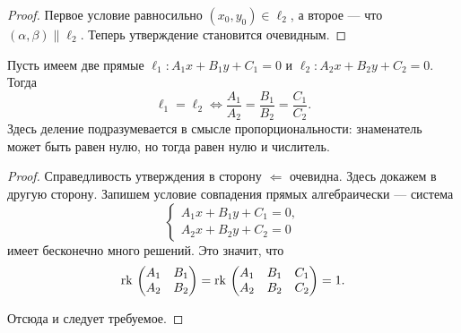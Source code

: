 \begin{proof}
    Первое условие равносильно $(x_0, y_0) \in \ell_2$, а второе --- что $(\alpha, \beta) \parallel \ell_2$. Теперь утверждение становится очевидным.
\end{proof}

\begin{statement}
    Пусть имеем две прямые $\ell_1: A_1x + B_1y + C_1 = 0$ и $\ell_2: A_2x + B_2y + C_2 = 0$. Тогда
    $$
    \ell_1 = \ell_2 \Leftrightarrow \frac{A_1}{A_2} = \frac{B_1}{B_2} = \frac{C_1}{C_2}.
    $$
    Здесь деление подразумевается в смысле пропорциональности: знаменатель может быть равен нулю, но тогда равен нулю и числитель.
\end{statement}

\begin{proof}
    Справедливость утверждения в сторону $\Leftarrow$ очевидна. Здесь докажем в другую сторону. Запишем условие совпадения прямых алгебраически --- система
    $$
    \begin{cases}
        A_1x + B_1y + C_1 = 0,\\
        A_2x + B_2y + C_2 = 0
    \end{cases}
    $$
    имеет бесконечно много решений. Это значит, что 
    $$
    \mathrm{rk}\,
    \begin{pmatrix}
        A_1 & B_1\\
        A_2 & B_2
    \end{pmatrix} = 
    \mathrm{rk}\,
    \begin{pmatrix}
        A_1 & B_1 & C_1\\
        A_2 & B_2 & C_2
    \end{pmatrix} = 1.
    $$

    Отсюда и следует требуемое.
\end{proof}

